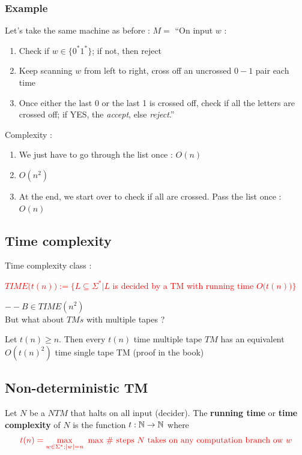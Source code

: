 \documentclass[12pt,a4paper]{article}
\newcommand{\<}{\langle}
\renewcommand{\>}{\rangle}
\begin{document}
\subsubsection{Example}
Let's take the same machine as before : $M =$ ``On input $w$ : 
\begin{enumerate}
    \item Check if $w \in \{0^*1^*\}$; if not, then reject
    \item Keep scanning $w$ from left to right, cross off an uncrossed $0-1$ pair each time
    \item Once either the last $0$ or the last 1 is crossed off, check if all the letters are crossed off; if YES, the \textit{accept}, else \textit{reject}.''
\end{enumerate}
Complexity :
\begin{enumerate}
    \item We just have to go through the list once : $O(n)$
    \item $O(n^2)$
    \item At the end, we start over to check if all are crossed. Pass the list once : $O(n)$
\end{enumerate}
\subsection{Time complexity}
\begin{boite}[1]
     Time complexity class :
    \begin{center}
        \textcolor{red}{$TIME\big(t(n)\big) := \{L \subseteq \Sigma^* | L$ is decided by a TM with running time $O\big(t(n)\big)\}$}
    \end{center}
\end{boite}
$--B \in TIME(n^2)$\\
But what about $TMs$ with multiple tapes ?
\begin{boite}
     Let $t(n) \geq n$. Then every $t(n)$ time multiple tape $TM$ has an equivalent $O(t(n)^2)$ time single tape TM (proof in the book)
\end{boite}
\subsection{Non-deterministic TM}
Let $N$ be a $NTM$ that halts on all input (decider). The \textbf{running time} or \textbf{time complexity} of $N$ is the function $t: \mathbb{N}\to \mathbb{N}$ where
\begin{equation}
    \textcolor{red}{t(n) = \max_{w\in \Sigma^*; |w| = n} \text{ max \# steps $N$ takes on any computation branch ow $w$}}
\end{equation}
\end{document}
